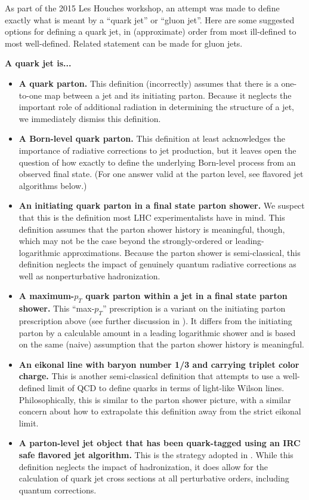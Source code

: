 \documentclass[11pt]{cernrep}
\begin{document}
As part of the 2015 Les Houches workshop, an attempt was made to
define exactly what is meant by a ``quark jet'' or ``gluon jet''.
Here are some suggested options for defining a quark jet, in
(approximate) order from most ill-defined to most well-defined.
Related statement can be made for gluon jets.

\noindent \textbf{A quark jet is...}
\begin{itemize}
\item \textbf{A quark parton.}  This definition (incorrectly) assumes that there is a one-to-one map between a jet and its initiating parton.  Because it neglects the important role of additional radiation in determining the structure of a jet, we immediately dismiss this definition.
\item \textbf{A Born-level quark parton.}  This definition at least acknowledges the importance of radiative corrections to jet production, but it leaves open the question of how exactly to define the underlying Born-level process from an observed final state.  (For one answer valid at the parton level, see flavored jet algorithms below.)
\item \textbf{An initiating quark parton in a final state parton
    shower.}  We suspect that this is the definition most LHC
  experimentalists have in mind.  This definition assumes that the parton shower history is meaningful, though,
  which may not be the case beyond the strongly-ordered or
  leading-logarithmic approximations.  Because the parton shower is
  semi-classical, this definition neglects the impact of genuinely
  quantum radiative corrections as well as nonperturbative
  hadronization.
\item \textbf{A maximum-$p_T$ quark parton within a jet in a final state parton shower.}  This ``max-$p_T$'' prescription is a variant on the initiating parton prescription above (see further discussion in \cite{Buckley:2015gua}).  It differs from the initiating parton by a calculable amount in a leading logarithmic shower \cite{Dasgupta:2014yra} and is based on the same (naive) assumption that the parton shower history is meaningful. 
\item \textbf{An eikonal line with baryon number 1/3 and carrying triplet color charge.}  This is another semi-classical definition that attempts to use a well-defined limit of QCD to define quarks in terms of light-like Wilson lines.  Philosophically, this is similar to the parton shower picture, with a similar concern about how to extrapolate this definition away from the strict eikonal limit.
\item \textbf{A parton-level jet object that has been quark-tagged using an IRC safe flavored jet algorithm.}  This is the strategy adopted in \cite{Banfi:2006hf}.  While this definition neglects the impact of hadronization, it does allow for the calculation of quark jet cross sections at all perturbative orders, including quantum corrections.
\end{itemize}
\end{document}
